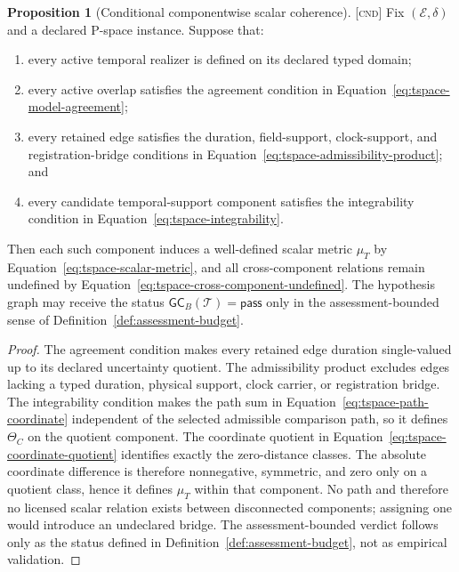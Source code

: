\documentclass[11pt]{article}
\newcommand{\Tspace}{\ensuremath{\mathcal{T}}}
\newcommand{\Cnd}{\textsc{[cnd]}}
\theoremstyle{definition}
\newtheorem{sproposition}{Proposition}
\begin{document}
\begin{sproposition}[Conditional componentwise scalar coherence]
\label{prop:tspace-coherence}
\Cnd{} Fix $(\mathcal E,\delta)$ and a declared P-space instance. Suppose that:
\begin{enumerate}
\item every active temporal realizer is defined on its declared typed domain;
\item every active overlap satisfies the agreement condition in
Equation~\eqref{eq:tspace-model-agreement};
\item every retained edge satisfies the duration, field-support, clock-support,
and registration-bridge conditions in
Equation~\eqref{eq:tspace-admissibility-product}; and
\item every candidate temporal-support component satisfies the integrability
condition in Equation~\eqref{eq:tspace-integrability}.
\end{enumerate}
Then each such component induces a well-defined scalar metric
$\mu_T$ by Equation~\eqref{eq:tspace-scalar-metric}, and all cross-component
relations remain undefined by Equation~\eqref{eq:tspace-cross-component-undefined}.
The hypothesis graph may receive the status
$\mathsf{GC}_B(\Tspace)=\mathsf{pass}$ only in the assessment-bounded sense of
Definition~\ref{def:assessment-budget}.
\end{sproposition}

\begin{proof}
The agreement condition makes every retained edge duration single-valued up to its
declared uncertainty quotient. The admissibility product excludes edges lacking a
typed duration, physical support, clock carrier, or registration bridge. The
integrability condition makes the path sum in
Equation~\eqref{eq:tspace-path-coordinate} independent of the selected admissible
comparison path, so it defines $\Theta_C$ on the quotient component. The coordinate quotient in
Equation~\eqref{eq:tspace-coordinate-quotient} identifies exactly the
zero-distance classes. The absolute coordinate difference is therefore
nonnegative, symmetric, and zero only on a quotient class, hence it defines
$\mu_T$ within that component. No
path and therefore no licensed scalar relation exists between disconnected
components; assigning one would introduce an undeclared bridge. The
assessment-bounded verdict follows only as the status defined in
Definition~\ref{def:assessment-budget}, not as empirical validation.
\end{proof}
\end{document}
